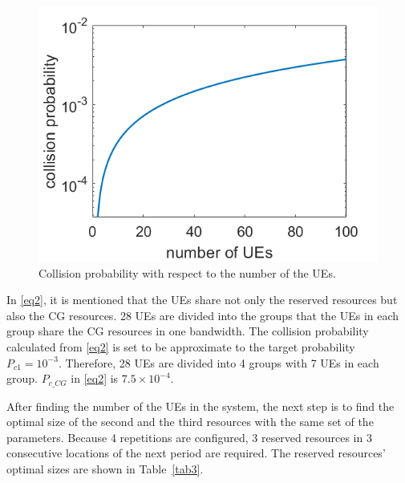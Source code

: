 \documentclass{ieeeaccess}
\begin{document}
\begin{figure}[htbp]
\centerline{\includegraphics[scale=0.35]{fig12.png}}
\caption{Collision probability with respect to the number of the UEs.}
\vspace{-2mm}
\label{fig12}

\end{figure}


In \eqref{eq2}, it is mentioned that the UEs share not only the reserved resources but also the CG resources. 28 UEs are divided into the groups that the UEs in each group share the CG resources in one bandwidth. The collision probability calculated from \eqref{eq2} is set to be approximate to the target probability $P_{c1}=10^{-3}$. Therefore, 28 UEs are divided into 4 groups with 7 UEs in each group. $P_{c\_CG}$ in \eqref{eq2} is $7.5\times10^{-4}$.


After finding the number of the UEs in the system, the next step is to find the optimal size of the second and the third resources with the same set of the parameters. Because 4 repetitions are configured, 3 reserved resources in 3 consecutive locations of the next period are required. The reserved resources' optimal sizes are shown in Table~\ref{tab3}.

\end{document}
